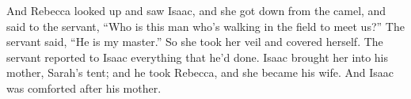 \begin{inparaenum}
   And Rebecca looked up and saw Isaac, and she got down from the camel,%
   and said to the servant, ``Who is this man who's walking in the field to meet us?'' The servant said, ``He is my master.'' So she took her veil and covered herself.%
   The servant reported to Isaac everything that he'd done.%
   Isaac brought her into his mother, Sarah's tent; and he took Rebecca, and she became his wife. And Isaac was comforted after his mother.%
\end{inparaenum}
